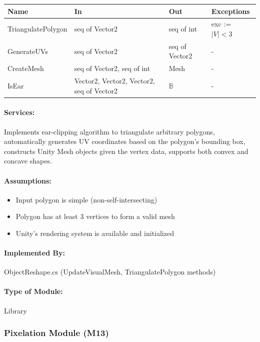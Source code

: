 \documentclass[12pt, titlepage]{article}
\begin{document}
\begin{center}
\begin{tabular}{p{35mm}p{5cm}p{28mm}p{28mm}}
\toprule
\textbf{Name} & \textbf{In} & \textbf{Out} & \textbf{Exceptions} \\
\midrule
TriangulatePolygon & seq of Vector2 & seq of int & exc := $|V| < 3$ \\
GenerateUVs & seq of Vector2 & seq of Vector2 & - \\
CreateMesh & seq of Vector2, seq of int & Mesh & - \\
IsEar & Vector2, Vector2, Vector2, seq of Vector2 & $\mathbb{B}$ & - \\
\bottomrule
\end{tabular}
\end{center}

\paragraph{Services:}
Implements ear-clipping algorithm to triangulate arbitrary polygons, automatically generates UV coordinates based on the polygon's bounding box, constructs Unity Mesh objects given the vertex data, supports both convex and concave shapes.

\paragraph{Assumptions:}
\begin{itemize}
\item Input polygon is simple (non-self-intersecting)
\item Polygon has at least 3 vertices to form a valid mesh
\item Unity's rendering system is available and initialized
\end{itemize}

\paragraph{Implemented By:}
ObjectReshape.cs (UpdateVisualMesh, TriangulatePolygon methods)

\paragraph{Type of Module:}
Library

\vspace{10mm}

\subsubsection{Pixelation Module (M13)} \label{M13}
\end{document}
